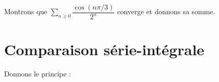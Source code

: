 \documentclass[a4paper,10pt]{report}
\newcommand{\Sum}[2]{\ensuremath{\textstyle{\sum\limits_{#1}^{#2}}}}
\begin{document}
\begin{ex} Montrons que $\Sum{n \geq 0}{} \dfrac{\cos(n \pi/3)}{2^n}$ converge et donnons sa somme.

\vspace{9.5cm}
\end{ex}

\section{Comparaison série-intégrale}

\noindent Donnons le principe :

%
%
%
%
%
%
\end{document}
